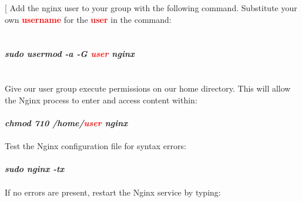 \documentclass[a4paper]{article}
\makeatletter
\def\step{%
	\@ifnextchar[ \@myitem{\@noitemargtrue\@myitem[\@itemlabel]}}
\def\@myitem[#1]{\item[#1]\mbox{}\\}
\newenvironment{Step}{%
	\begin{enumerate}[label= \textbf {Step} \arabic*,align=left, leftmargin=1.0cm]%
	}{
\end{enumerate}%
}
\makeatother
\begin{document}
\begin{Step}
\step
Add the nginx user to your group with the following command. Substitute your own \textbf{\textcolor{red}{username}} for the \textbf{\textcolor{red}{user}} in the command:\\ \\\\
\textbf{\emph{ sudo usermod -a -G \textcolor{red}{user} nginx}}\\\\\\

Give our user group execute permissions on our home directory. This will allow the Nginx process to enter and access content within:\\\\
\textbf{\emph{chmod 710 /home/\textcolor{red}{user} nginx}}\\\\

Test the Nginx configuration file for syntax errors:\\\\
\textbf{\emph{sudo nginx -tx}}\\\\

If no errors are present, restart the Nginx service by typing:

\end{Step}
	
	
	
	
	











	\newpage	
	
		
	\clearpage 
\end{document}
